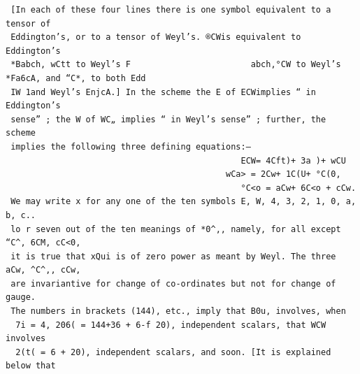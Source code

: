 \documentclass[10pt]{article}
\begin{document}
\begin{verbatim}
 [In each of these four lines there is one symbol equivalent to a tensor of
 Eddington’s, or to a tensor of Weyl’s. ®CWis equivalent to Eddington’s
 *Babch, wCtt to Weyl’s F                        abch,°CW to Weyl’s *Fa6cA, and “C*, to both Edd
 IW 1and Weyl’s EnjcA.] In the scheme the E of ECWimplies “ in Eddington’s
 sense” ; the W of WC„ implies “ in Weyl’s sense” ; further, the scheme
 implies the following three defining equations:—
                                               ECW= 4Cft)+ 3a )+ wCU
                                            wCa> = 2Cw+ 1C(U+ °C(0,
                                               °C<o = aCw+ 6C<o + cCw.
 We may write x for any one of the ten symbols E, W, 4, 3, 2, 1, 0, a, b, c..
 lo r seven out of the ten meanings of *0^,, namely, for all except “C^, 6CM, cC<0,
 it is true that xQui is of zero power as meant by Weyl. The three aCw, ^C^,, cCw,
 are invariantive for change of co-ordinates but not for change of gauge.
 The numbers in brackets (144), etc., imply that B0u, involves, when
  7i = 4, 206( = 144+36 + 6-f 20), independent scalars, that WCW involves
  2(t( = 6 + 20), independent scalars, and soon. [It is explained below that


\end{verbatim}
\clearpage
\end{document}
